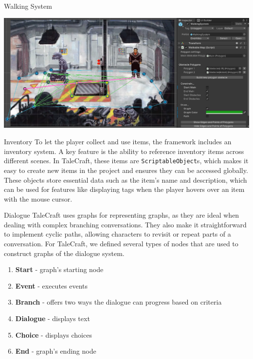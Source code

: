 \documentclass[portrait,a0paper,fontscale=0.35]{baposter}
\begin{document}
\begin{poster}
\begin{posterbox}[column=0, span=1, name=ws, below=cs]{Walking System}
\begin{center}
\includegraphics[width=1\linewidth]{img/walkable_map4.png}
\end{center}
\end{posterbox}

%
%
%

\begin{posterbox}[column=1, span=1, name=is]{Inventory}
To let the player collect and use items, the framework includes an inventory system. A key feature is the ability to reference inventory items across different scenes. In TaleCraft, these items are \verb|ScriptableObject|s, which makes it easy to create new items in the project and ensures they can be accessed globally. These objects store essential data such as the item's name and description, which can be used for features like displaying tags when the player hovers over an item with the mouse cursor.
\end{posterbox}

\begin{posterbox}[column=1, span=1, name=ds, below=is, %
]{Dialogue}
TaleCraft uses graphs for representing graphs, as they are ideal when dealing with complex branching conversations. They also make it straightforward to implement cyclic paths, allowing characters to revisit or repeat parts of a conversation. For TaleCraft, we defined several types of nodes that are used to construct graphs of the dialogue system.

\begin{multicols}{2}
\begin{enumerate}
\setlength
\itemsep{0.0em}
    \item \textbf{Start} - graph's starting node
    \item \textbf{Event} - executes events
    \item \textbf{Branch} - offers two ways the dialogue can progress based on criteria
    \item \textbf{Dialogue} - displays text
    \item \textbf{Choice} - displays choices
    \item \textbf{End} - graph's ending node
\end{enumerate}
\end{multicols}


\end{posterbox}
\end{poster}
\end{document}
